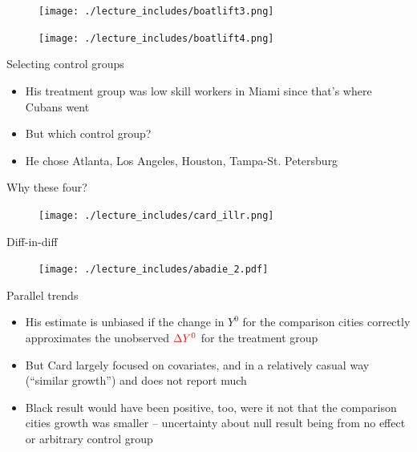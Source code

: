 \documentclass{beamer}
\begin{document}
\begin{frame}[plain]
	\begin{figure}
	\texttt{[image: ./lecture\_includes/boatlift3.png]}
	\end{figure}
\end{frame}

\begin{frame}[plain]
	\begin{figure}
	\texttt{[image: ./lecture\_includes/boatlift4.png]}
	\end{figure}
\end{frame}


\begin{frame}{Selecting control groups}

\begin{itemize}

\item His treatment group was low skill workers in Miami since that's where Cubans went
\item But which control group?
\item He chose Atlanta, Los Angeles, Houston, Tampa-St. Petersburg

\end{itemize}

\end{frame}



\begin{frame}{Why these four?}

	\begin{figure}
	\texttt{[image: ./lecture\_includes/card\_illr.png]}
	\end{figure}

\end{frame}

\begin{frame}{Diff-in-diff}
	
	\begin{figure}
	\texttt{[image: ./lecture\_includes/abadie\_2.pdf]}
	\end{figure}
\end{frame}

\begin{frame}{Parallel trends}

\begin{itemize}
\item His estimate is unbiased if the change in $Y^0$ for the comparison cities correctly approximates the unobserved $\textcolor{red}{\Delta Y^0}$ for the treatment group
\item But Card largely focused on covariates, and in a relatively casual way (``similar growth'') and does not report much
\item Black result would have been positive, too, were it not that the comparison cities growth was smaller -- uncertainty about null result being from no effect or arbitrary control group
\end{itemize}

\end{frame}
\end{document}
